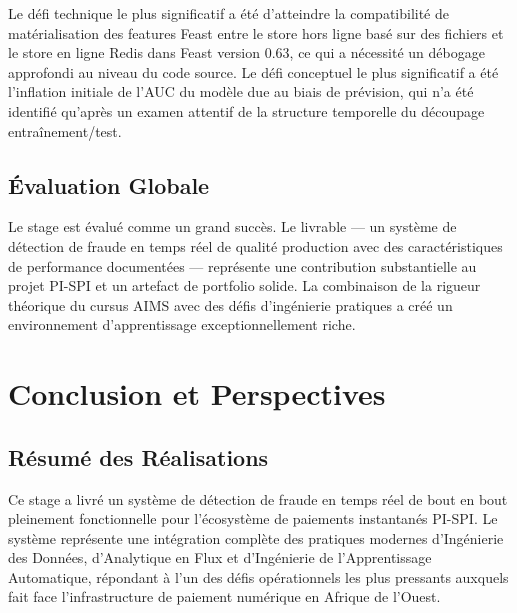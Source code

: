 \documentclass[12pt,a4paper,oneside]{book}
\theoremstyle{definition}
\theoremstyle{plain}
\begin{document}
Le défi technique le plus significatif a été d'atteindre la compatibilité de matérialisation des features Feast entre le store hors ligne basé sur des fichiers et le store en ligne Redis dans Feast version 0.63, ce qui a nécessité un débogage approfondi au niveau du code source. Le défi conceptuel le plus significatif a été l'inflation initiale de l'AUC du modèle due au biais de prévision, qui n'a été identifié qu'après un examen attentif de la structure temporelle du découpage entraînement/test.

\section{Évaluation Globale}

Le stage est évalué comme un grand succès. Le livrable — un système de détection de fraude en temps réel de qualité production avec des caractéristiques de performance documentées — représente une contribution substantielle au projet PI-SPI et un artefact de portfolio solide. La combinaison de la rigueur théorique du cursus AIMS avec des défis d'ingénierie pratiques a créé un environnement d'apprentissage exceptionnellement riche.

\chapter{Conclusion et Perspectives}
\label{chap:conclusion}

\section{Résumé des Réalisations}

Ce stage a livré un système de détection de fraude en temps réel de bout en bout pleinement fonctionnelle pour l'écosystème de paiements instantanés PI-SPI. Le système représente une intégration complète des pratiques modernes d'Ingénierie des Données, d'Analytique en Flux et d'Ingénierie de l'Apprentissage Automatique, répondant à l'un des défis opérationnels les plus pressants auxquels fait face l'infrastructure de paiement numérique en Afrique de l'Ouest.
\end{document}

